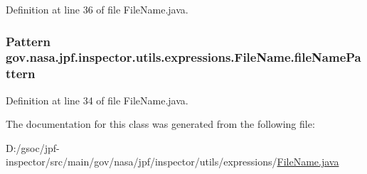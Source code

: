 Definition at line 36 of file File\+Name.\+java.

\subsubsection[{\texorpdfstring{file\+Name\+Pattern}{fileNamePattern}}]{\setlength{\rightskip}{0pt plus 5cm}Pattern gov.\+nasa.\+jpf.\+inspector.\+utils.\+expressions.\+File\+Name.\+file\+Name\+Pattern\hspace{0.3cm}{\ttfamily [private]}}\hypertarget{classgov_1_1nasa_1_1jpf_1_1inspector_1_1utils_1_1expressions_1_1_file_name_a0f02e6314dcb708f4561412d4014b407}{}\label{classgov_1_1nasa_1_1jpf_1_1inspector_1_1utils_1_1expressions_1_1_file_name_a0f02e6314dcb708f4561412d4014b407}


Definition at line 34 of file File\+Name.\+java.



The documentation for this class was generated from the following file\+:\begin{DoxyCompactItemize}
\item 
D\+:/gsoc/jpf-\/inspector/src/main/gov/nasa/jpf/inspector/utils/expressions/\hyperlink{_file_name_8java}{File\+Name.\+java}\end{DoxyCompactItemize}
